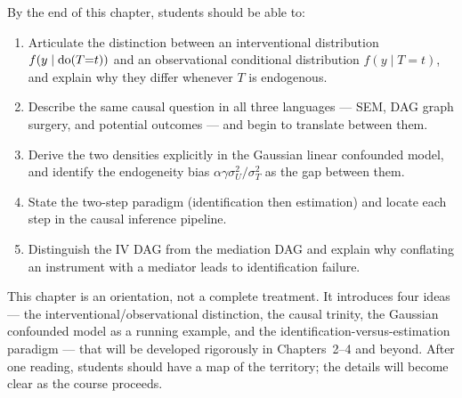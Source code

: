 \documentclass[master.tex]{subfiles}
\begin{document}

\begin{tcolorbox}[defstyle, title={Learning Objectives}]
By the end of this chapter, students should be able to:
\begin{enumerate}
  \item Articulate the distinction between an interventional distribution
        $f(y \mid \mathrm{do}(T{=}t))$ and an observational conditional distribution
        $f(y \mid T{=}t)$, and explain why they differ whenever $T$ is
        endogenous.
  \item Describe the same causal question in all three languages --- SEM,
        DAG graph surgery, and potential outcomes --- and begin to translate
        between them.
  \item Derive the two densities explicitly in the Gaussian linear
        confounded model, and identify the endogeneity bias
        $\alpha\gamma\sigma_U^2/\sigma_T^2$ as the gap between them.
  \item State the two-step paradigm (identification then estimation) and
        locate each step in the causal inference pipeline.
  \item Distinguish the IV DAG from the mediation DAG and explain why
        conflating an instrument with a mediator leads to identification
        failure.
\end{enumerate}
\end{tcolorbox}

\medskip\noindent
This chapter is an orientation, not a complete treatment.  It introduces
four ideas --- the interventional/observational distinction, the causal
trinity, the Gaussian confounded model as a running example, and the
identification-versus-estimation paradigm --- that will be developed
rigorously in Chapters~2--4 and beyond.  After one reading, students
should have a map of the territory; the details will become clear as
the course proceeds.
\end{document}
